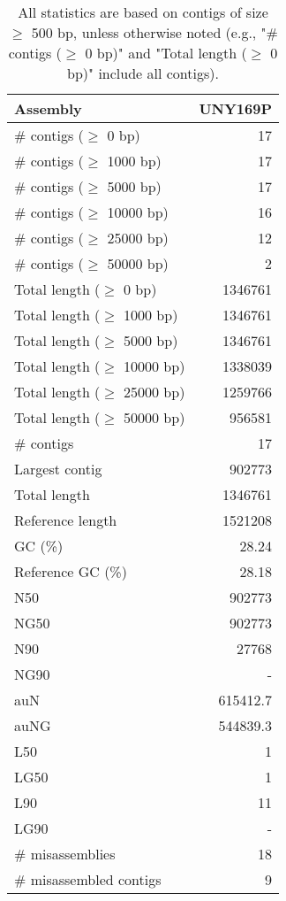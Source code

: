 \documentclass[12pt,a4paper]{article}
\begin{document}
\begin{table}[ht]
\begin{center}
\caption{All statistics are based on contigs of size $\geq$ 500 bp, unless otherwise noted (e.g., "\# contigs ($\geq$ 0 bp)" and "Total length ($\geq$ 0 bp)" include all contigs).}
\begin{tabular}{|l*{1}{|r}|}
\hline
Assembly & UNY169P \\ \hline
\# contigs ($\geq$ 0 bp) & 17 \\ \hline
\# contigs ($\geq$ 1000 bp) & 17 \\ \hline
\# contigs ($\geq$ 5000 bp) & 17 \\ \hline
\# contigs ($\geq$ 10000 bp) & 16 \\ \hline
\# contigs ($\geq$ 25000 bp) & 12 \\ \hline
\# contigs ($\geq$ 50000 bp) & 2 \\ \hline
Total length ($\geq$ 0 bp) & 1346761 \\ \hline
Total length ($\geq$ 1000 bp) & 1346761 \\ \hline
Total length ($\geq$ 5000 bp) & 1346761 \\ \hline
Total length ($\geq$ 10000 bp) & 1338039 \\ \hline
Total length ($\geq$ 25000 bp) & 1259766 \\ \hline
Total length ($\geq$ 50000 bp) & 956581 \\ \hline
\# contigs & 17 \\ \hline
Largest contig & 902773 \\ \hline
Total length & 1346761 \\ \hline
Reference length & 1521208 \\ \hline
GC (\%) & 28.24 \\ \hline
Reference GC (\%) & 28.18 \\ \hline
N50 & 902773 \\ \hline
NG50 & 902773 \\ \hline
N90 & 27768 \\ \hline
NG90 & - \\ \hline
auN & 615412.7 \\ \hline
auNG & 544839.3 \\ \hline
L50 & 1 \\ \hline
LG50 & 1 \\ \hline
L90 & 11 \\ \hline
LG90 & - \\ \hline
\# misassemblies & 18 \\ \hline
\# misassembled contigs & 9 \\ \hline

\end{tabular}
\end{center}
\end{table}
\end{document}
